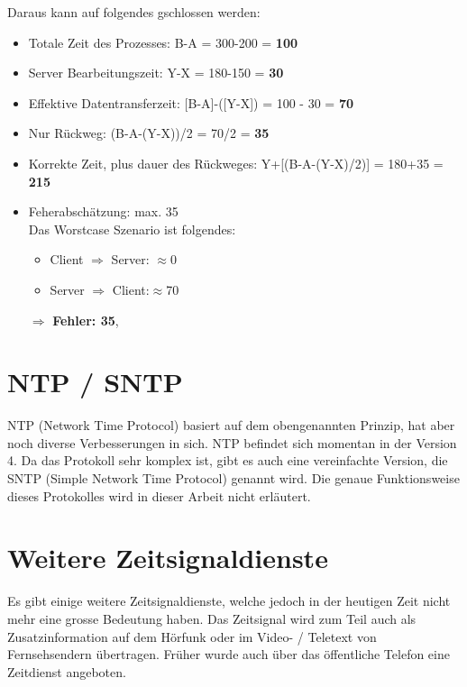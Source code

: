 Daraus kann auf folgendes gschlossen werden:
\begin{itemize}
\item Totale Zeit des Prozesses: B-A = 300-200 = \textbf{100}
\item Server Bearbeitungszeit: Y-X = 180-150 = \textbf{30}
\item Effektive Datentransferzeit: [B-A]-([Y-X]) = 100 - 30 = \textbf{70}
\item Nur Rückweg: (B-A-(Y-X))/2 = 70/2 = \textbf{35}
\item Korrekte Zeit, plus dauer des Rückweges: Y+[(B-A-(Y-X)/2)] = 180+35 = \textbf{215}
\item Feherabschätzung: max. 35\\
Das Worstcase Szenario ist folgendes:\\
\begin{itemize}
\item Client $\Rightarrow$ Server: $\approx$0
\item Server $\Rightarrow$ Client:$ \approx$70
\end{itemize}
$\Rightarrow$ \textbf{Fehler: 35},
\end{itemize}



\section{NTP / SNTP}
NTP (Network Time Protocol) basiert auf dem obengenannten Prinzip, hat aber noch diverse Verbesserungen in sich.
NTP befindet sich momentan in der Version 4.
Da das Protokoll sehr komplex ist, gibt es auch eine vereinfachte Version, die SNTP (Simple Network Time Protocol) genannt wird.
Die genaue Funktionsweise dieses Protokolles wird in dieser Arbeit nicht erläutert.



\section{Weitere Zeitsignaldienste}
Es gibt einige weitere Zeitsignaldienste, welche jedoch in der heutigen Zeit nicht mehr eine grosse Bedeutung haben. Das Zeitsignal wird zum Teil auch als Zusatzinformation auf dem Hörfunk oder im Video- / Teletext von Fernsehsendern übertragen. Früher wurde auch über das öffentliche Telefon eine Zeitdienst angeboten.

